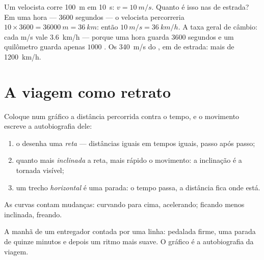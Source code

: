 \begin{example}\label{ex:g7:motion-average-speed:units}
Um velocista corre \qty{100}{m} em \qty{10}{s}:
$v = \qty{10}{m/s}$. Quanto é isso nas  de estrada? Em uma
hora --- $3600$ segundos --- o velocista percorreria
$10 \times 3600 = \qty{36000}{m} = \qty{36}{km}$: então
$\qty{10}{m/s} = \qty{36}{km/h}$. A taxa geral de câmbio: cada
\unit{m/s} vale \qty{3.6}{km/h} --- porque uma hora guarda $3600$
segundos e um quilômetro guarda apenas $1000$ . Os
\qty{340}{m/s} do , em  de estrada: mais de
\qty{1200}{km/h}.
\end{example}

\section{A viagem como retrato}

\begin{proposition}\label{prop:g7:motion-average-speed:graphs}
Coloque num gráfico a distância percorrida contra o tempo, e o
movimento escreve a autobiografia dele:
\begin{enumerate}
  \item o  desenha uma \emph{reta} --- distâncias
        iguais em tempos iguais, passo após passo;
  \item quanto mais \emph{inclinada} a reta, mais rápido o
        movimento: a inclinação é a  tornada visível;
  \item um trecho \emph{horizontal} é uma parada: o tempo passa, a
        distância fica onde está.
\end{enumerate}
As curvas contam mudanças: curvando para cima, acelerando; ficando
menos inclinada, freando.
\end{proposition}

\begin{omfigure}

{\small A manhã de um entregador contada por uma linha: pedalada
firme, uma parada de quinze minutos e depois um ritmo mais suave. O
gráfico é a autobiografia da viagem.}
\end{omfigure}

